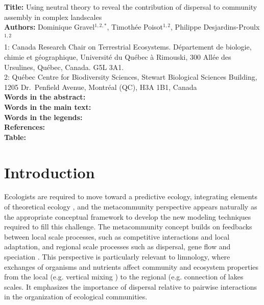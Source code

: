 \documentclass[12pt]{article}
\begin{document}
\linenumbers 
\modulolinenumbers[1]

\textbf{Title:}   Using neutral theory to reveal the contribution of dispersal to community assembly in complex landscales\\

\textbf{Authors:}  Dominique Gravel$^{1,2,*}$, Timoth\'ee Poisot$^{1,2}$, Philippe Desjardins-Proulx$^{1,2}$\\

1: Canada Research Chair on Terrestrial Ecosystems. D\'epartement de biologie, chimie et g\'eographique, Universit\'e du Qu\'ebec \`a Rimouski, 300 All\'ee des Ursulines, Qu\'ebec, Canada. G5L 3A1.\\

2: Qu\'ebec Centre for Biodiversity Sciences, Stewart Biological Sciences Building, 1205 Dr.~Penfield Avenue, Montr\'eal (QC), H3A 1B1, Canada\\

\textbf{Words in the abstract:}      \\
\textbf{Words in the main text:}    \\
\textbf{Words in the legends:}    \\
\textbf{References:}             \\
\textbf{Table:}                    \\

\newpage
\doublespacing

\section{Introduction}

Ecologists are required to move toward a predictive ecology,
integrating elements of theoretical ecology \parencite{Thuiller2013}, and the
metacommunity perspective appears naturally as the appropriate conceptual
framework to develop the new modeling techniques required to fill this
challenge. The metacommunity concept builds on 
feedbacks between local scale processes, such as competitive interactions and
local adaptation, and regional scale processes such as dispersal, gene flow and
speciation \textcite{Leibold2004a}. This perspective is particularly relevant to
limnology, where exchanges of organisms and nutrients affect community and
ecosystem properties from the local (e.g. vertical mixing
\parencite{Ryabov2011}) to the regional (e.g. connection of lakes
\parencite{Leibold2004b} scales. It emphasizes the importance of dispersal
relative to pairwise interactions in the organization of ecological communities.
\end{document}
